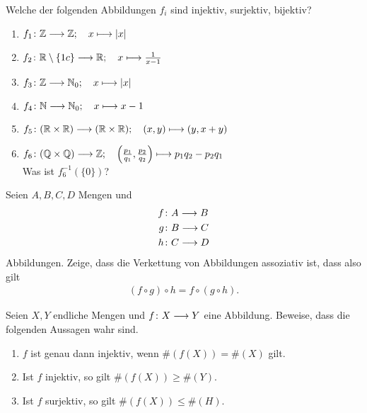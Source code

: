 \begin{aufg}
  Welche der folgenden Abbildungen $f_{i}$ sind injektiv, surjektiv, bijektiv?
  \begin{enumerate}
    \item $f_{1}\colon\mathbb Z \longrightarrow \mathbb Z;\quad x \longmapsto |x|$
    \item $f_{2}\colon\mathbb R\setminus\{1c\} \longrightarrow \mathbb R;\quad x \longmapsto \frac{1}{x - 1}$
    \item $f_{3}\colon\mathbb Z \longrightarrow \mathbb N_{0};\quad x \longmapsto |x|$
    \item $f_{4}\colon\mathbb N \longrightarrow \mathbb N_{0}; \quad x \longmapsto x-1$
    \item $f_{5}\colon(\mathbb R\times\mathbb R) \longrightarrow (\mathbb R\times\mathbb R);\quad (x,y) \longmapsto (y,x+y)$
    \item $f_{6}\colon(\mathbb Q\times\mathbb Q) \longrightarrow \mathbb Z;\quad
      \left(\frac{p_{1}}{q_{1}},\frac{p_{2}}{q_{2}}\right) \longmapsto p_{1}q_{2}
      - p_{2}q_{1}$\\
      Was ist $f_{6}^{-1}(\{0\})$?
  \end{enumerate}
\end{aufg}


\begin{aufg}

  Seien $A,B,C,D$ Mengen und 
  \begin{align*}
    f \colon &A \longrightarrow B \\
    g \colon &B \longrightarrow C \\
    h \colon &C \longrightarrow D
  \end{align*}
  Abbildungen. Zeige, dass die Verkettung von Abbildungen assoziativ ist,
  dass also gilt
  \begin{align*}
    (f \circ g)\circ h = f \circ (g \circ h).
  \end{align*}
  
\end{aufg}


\begin{aufg}

  Seien $X,Y$ endliche Mengen und $f\colon X\longrightarrow Y$ eine Abbildung. Beweise,
  dass die folgenden Aussagen wahr sind.

  \begin{enumerate}
    \item $f$ ist genau dann injektiv, wenn $\#(f(X)) = \#(X)$ gilt.
    \item Ist $f$ injektiv, so gilt $\#(f(X)) \geq \#(Y)$.
    \item Ist $f$ surjektiv, so gilt $\#(f(X)) \leq \#(H)$.
  \end{enumerate}

\end{aufg}

